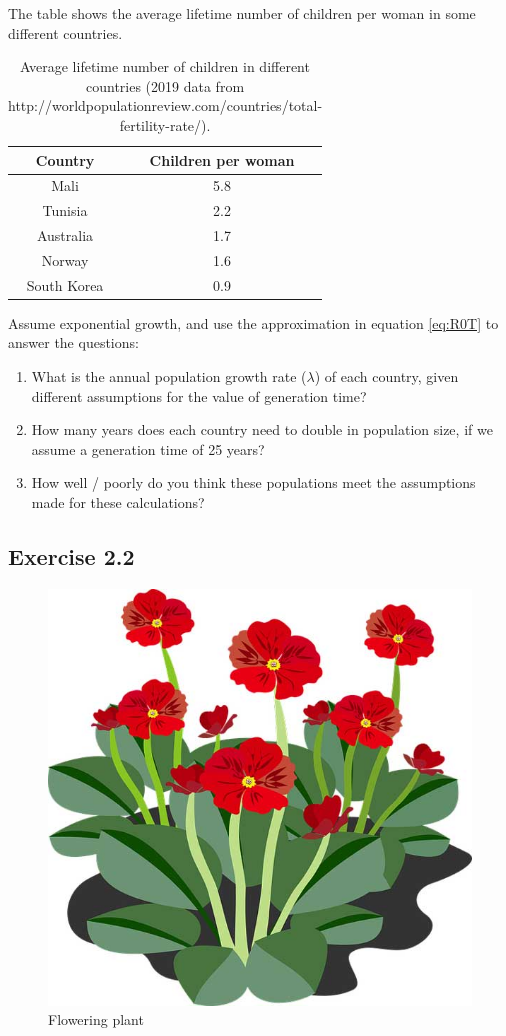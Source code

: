 \documentclass[
]{book}
\begin{document}
The table shows the average lifetime number of children per woman in some different countries.

\begin{table}

\caption{\label{tab:table21}Average lifetime number of children in different countries (2019 data from http://worldpopulationreview.com/countries/total-fertility-rate/).}
\centering
\begin{tabular}[t]{cc}
\toprule
Country & Children per woman\\
\midrule
Mali & 5.8\\
Tunisia & 2.2\\
Australia & 1.7\\
Norway & 1.6\\
South Korea & 0.9\\
\bottomrule
\end{tabular}
\end{table}

Assume exponential growth, and use the approximation in equation \eqref{eq:R0T} to answer the questions:

\begin{enumerate}
\def\labelenumi{\arabic{enumi}.}
\item
  What is the annual population growth rate (\(\lambda\)) of each country, given different assumptions for the value of generation time?
\item
  How many years does each country need to double in population size, if we assume a generation time of 25 years?
\item
  How well / poorly do you think these populations meet the assumptions made for these calculations?
\end{enumerate}

\hypertarget{exercise-2.2}{%
\subsection*{Exercise 2.2}\label{exercise-2.2}}

\begin{figure}
\includegraphics[width=0.4\linewidth]{plant} \caption{Flowering plant}\label{fig:plant}
\end{figure}
\end{document}
